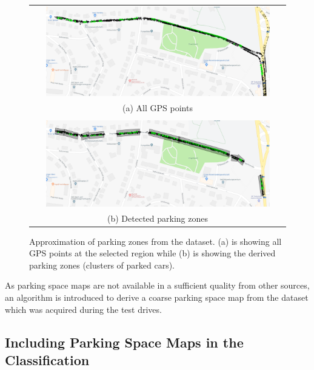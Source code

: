 \begin{figure}
\centering
\def\arraystretch{1.2}

\begin{tabular}{ c }
	\includegraphics[width=0.9\textwidth]{img/parking_space_map_all_gps_2.PNG}
	\\
	(a) All GPS points
	\\
    \\
	\includegraphics[width=0.9\textwidth]{img/parking_space_map_zones_2.PNG}
    \\
    (b) Detected parking zones
\end{tabular}

	\caption{Approximation of parking zones from the dataset. (a) is showing all GPS points at the selected region while (b) is showing the derived parking zones (clusters of parked cars).}
	\label{fig:parking_space_map}
\end{figure}


As parking space maps are not available in a sufficient quality from other sources, an algorithm is introduced to derive a coarse parking space map from the dataset which was acquired during the test drives. 






\subsection{Including Parking Space Maps in the Classification}






